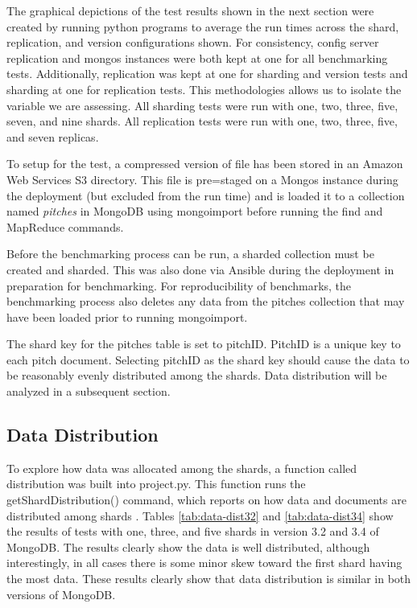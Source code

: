 \documentclass[9pt,twocolumn,twoside]{../../styles/osajnl}
\begin{document}
The graphical depictions of the test results shown in the next section
were created by running python programs to average the run times
across the shard, replication, and version configurations shown. For
consistency, config server replication and mongos instances were both
kept at one for all benchmarking tests. Additionally, replication was
kept at one for sharding and version tests and sharding at one for
replication tests. This methodologies allows us to isolate the
variable we are assessing. All sharding tests were run with one, two,
three, five, seven, and nine shards. All replication tests were run
with one, two, three, five, and seven replicas.


To setup for the test, a compressed version of file has been stored in
an Amazon Web Services S3 directory. This file is pre=staged on a
Mongos instance during the deployment (but excluded from the run time)
and is loaded it to a collection named \emph{pitches} in MongoDB using
mongoimport before running the find and MapReduce commands.


Before the benchmarking process can be run, a sharded collection must
be created and sharded. This was also done via Ansible during the
deployment in preparation for benchmarking. For reproducibility of
benchmarks, the benchmarking process also deletes any data from the
pitches collection that may have been loaded prior to running
mongoimport.


The shard key for the pitches table is set to pitchID. PitchID is a
unique key to each pitch document. Selecting pitchID as the shard key
should cause the data to be reasonably evenly distributed among the
shards. Data distribution will be analyzed in a subsequent section.




\subsection{Data Distribution}

To explore how data was allocated among the shards, a function called
distribution was built into project.py. This function runs the
getShardDistribution() command, which reports on how data and
documents are distributed among shards \cite{www-shardDist}. Tables
\ref{tab:data-dist32} and \ref{tab:data-dist34} show the results of
tests with one, three, and five shards in version 3.2 and 3.4 of
MongoDB. The results clearly show the data is well distributed,
although interestingly, in all cases there is some minor skew toward
the first shard having the most data. These results clearly show that
data distribution is similar in both versions of MongoDB.
\end{document}

